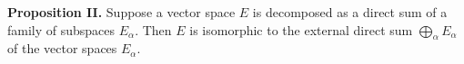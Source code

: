 \textbf{Proposition II.} Suppose a vector space $E$ is decomposed as a direct sum of a family of subspaces $E_\alpha$. Then $E$ is isomorphic to the external direct sum $\bigoplus_{\alpha} E_\alpha$ of the vector spaces $E_\alpha$.
